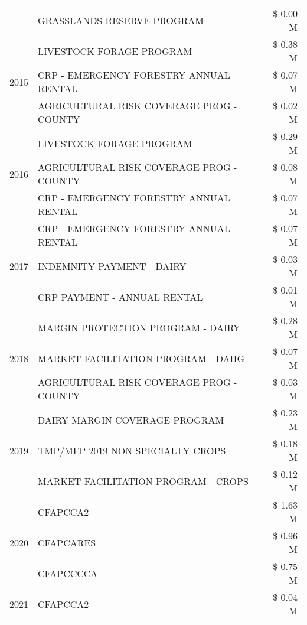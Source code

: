\begin{tabular}{llr}
 & GRASSLANDS RESERVE PROGRAM & \$ 0.00 M \\
\cline{1-3}
\multirow[t]{3}{*}{2015} & LIVESTOCK FORAGE PROGRAM & \$ 0.38 M \\
 & CRP - EMERGENCY FORESTRY ANNUAL RENTAL & \$ 0.07 M \\
 & AGRICULTURAL RISK COVERAGE PROG - COUNTY & \$ 0.02 M \\
\cline{1-3}
\multirow[t]{3}{*}{2016} & LIVESTOCK FORAGE PROGRAM & \$ 0.29 M \\
 & AGRICULTURAL RISK COVERAGE PROG - COUNTY & \$ 0.08 M \\
 & CRP - EMERGENCY FORESTRY ANNUAL RENTAL & \$ 0.07 M \\
\cline{1-3}
\multirow[t]{3}{*}{2017} & CRP - EMERGENCY FORESTRY ANNUAL RENTAL & \$ 0.07 M \\
 & INDEMNITY PAYMENT - DAIRY & \$ 0.03 M \\
 & CRP PAYMENT - ANNUAL RENTAL & \$ 0.01 M \\
\cline{1-3}
\multirow[t]{3}{*}{2018} & MARGIN PROTECTION PROGRAM - DAIRY & \$ 0.28 M \\
 & MARKET FACILITATION PROGRAM - DAHG & \$ 0.07 M \\
 & AGRICULTURAL RISK COVERAGE PROG - COUNTY & \$ 0.03 M \\
\cline{1-3}
\multirow[t]{3}{*}{2019} & DAIRY MARGIN COVERAGE PROGRAM & \$ 0.23 M \\
 & TMP/MFP 2019 NON SPECIALTY CROPS & \$ 0.18 M \\
 & MARKET FACILITATION PROGRAM - CROPS & \$ 0.12 M \\
\cline{1-3}
\multirow[t]{3}{*}{2020} & CFAPCCA2 & \$ 1.63 M \\
 & CFAPCARES & \$ 0.96 M \\
 & CFAPCCCCA & \$ 0.75 M \\
\cline{1-3}
2021 & CFAPCCA2 & \$ 0.04 M \\
\cline{1-3}
\bottomrule
\end{tabular}
